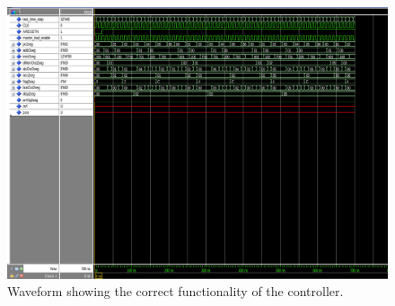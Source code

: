\begin{figure}
    \caption{Waveform showing the correct functionality of the controller.}
    \label{lab3_2:waveform}
    \centering
    \includegraphics[width=\textwidth]{lab3_waveform.png}
  \end{figure}